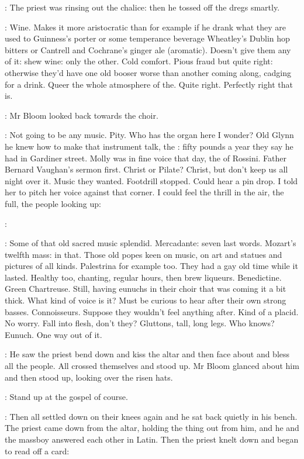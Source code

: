 :
The priest was rinsing out the chalice:
then he tossed off the dregs smartly.

\BloomInt:
Wine.
Makes it more aristocratic than
for example if he drank
what they are used to
Guinness's porter or some temperance beverage
Wheatley's Dublin hop bitters
or Cantrell and Cochrane's ginger ale (aromatic).
Doesn't give them any of it:
shew wine:
only the other.
Cold comfort.
Pious fraud but quite right:
otherwise they'd have one old booser worse than another coming along,
cadging for a drink.
Queer the whole atmosphere of the.
Quite right.
Perfectly right that is.

:
Mr Bloom looked back towards the choir.

\BloomInt:
Not going to be any music.
Pity.
Who has the organ here I wonder?
Old Glynn he knew how to make that instrument talk,
the :
fifty pounds a year they say he had in Gardiner street.
Molly was in fine voice that day,
the  of Rossini.
Father Bernard Vaughan's sermon first.
Christ or Pilate?
Christ,
but don't keep us all night over it.
Music they wanted.
Footdrill stopped.
Could hear a pin drop.
I told her to pitch her voice against that corner.
I could feel the thrill in the air,
the full,
the people looking up:

\priest:

\BloomInt:
Some of that old sacred music splendid.
Mercadante: seven last words.
Mozart's twelfth mass:
 in that.
Those old popes keen on music,
on art and statues and pictures of all kinds.
Palestrina for example too.
They had a gay old time while it lasted.
Healthy too,
chanting,
regular hours,
then brew liqueurs.
Benedictine.
Green Chartreuse.
Still, having eunuchs in their choir
that was coming it a bit thick.
What kind of voice is it?
Must be curious to hear after their own strong basses.
Connoisseurs.
Suppose they wouldn't feel anything after.
Kind of a placid.
No worry.
Fall into flesh, don't they?
Gluttons, tall, long legs.
Who knows?
Eunuch.
One way out of it.

:
He saw the priest bend down and kiss the altar
and then face about and bless all the people.
All crossed themselves and stood up.
Mr Bloom glanced about him
and then stood up,
looking over the risen hats.

\BloomInt:
Stand up at the gospel of course.

:
Then all settled down on their knees again
and he sat back quietly in his bench.
The priest came down from the altar,
holding the thing out from him,
and he and the massboy answered each other in Latin.
Then the priest knelt down and began to read off a card:

